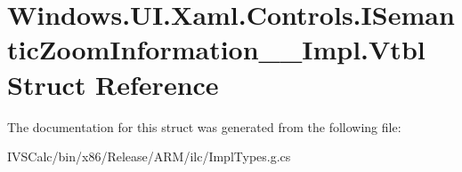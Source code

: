 \hypertarget{struct_windows_1_1_u_i_1_1_xaml_1_1_controls_1_1_i_semantic_zoom_information_____impl_1_1_vtbl}{}\section{Windows.\+U\+I.\+Xaml.\+Controls.\+I\+Semantic\+Zoom\+Information\+\_\+\+\_\+\+Impl.\+Vtbl Struct Reference}
\label{struct_windows_1_1_u_i_1_1_xaml_1_1_controls_1_1_i_semantic_zoom_information_____impl_1_1_vtbl}


The documentation for this struct was generated from the following file\+:\begin{DoxyCompactItemize}
\item 
I\+V\+S\+Calc/bin/x86/\+Release/\+A\+R\+M/ilc/Impl\+Types.\+g.\+cs\end{DoxyCompactItemize}
